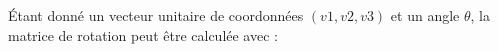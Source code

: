 Étant donné un vecteur unitaire de coordonnées $(v1, v2, v3)$ et
un angle $\theta$, la matrice de rotation peut être calculée avec :

